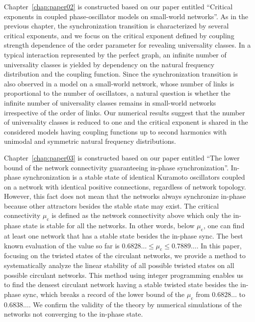 Chapter~\ref{chap:paper02} is constructed based on our paper \cite{yoneda2020} entitled ``Critical exponents in coupled phase-oscillator models on small-world networks''.
As in the previous chapter, the synchronization transition is characterized by several critical exponents, and we focus on the critical exponent defined by coupling strength dependence of the order parameter for revealing universality classes. In a typical interaction represented by the perfect graph, an infinite number of universality classes is yielded by dependency on the natural frequency distribution and the coupling function. Since the synchronization transition is also observed in a model on a small-world network, whose number of links is proportional to the number of oscillators, a natural question is whether the infinite number of universality classes remains in small-world networks irrespective of the order of links. Our numerical results suggest that the number of universality classes is reduced to one and the critical exponent is shared in the considered models having coupling functions up to second harmonics with unimodal and symmetric natural frequency distributions.

Chapter~\ref{chap:paper03} is constructed based on our paper \cite{yoneda2021} entitled ``The lower bound of the network connectivity guaranteeing in-phase synchronization''.
In-phase synchronization is a stable state of identical Kuramoto oscillators coupled on a network with identical positive connections, regardless of network topology. However, this fact does not mean that the networks always synchronize in-phase because other attractors besides the stable state may exist. The critical connectivity $\mu_{\mathrm{c}}$ is defined as the network connectivity above which only the in-phase state is stable for all the networks. In other words, below $\mu_{\mathrm{c}}$, one can find at least one network that has a stable state besides the in-phase sync. The best known evaluation of the value so far is $0.6828\dots\leq\mu_{\mathrm{c}}\leq0.7889\dots$. In this paper, focusing on the twisted states of the circulant networks, we provide a method to systematically analyze the linear stability of all possible twisted states on all possible circulant networks. This method using integer programming enables us to find the densest circulant network having a stable twisted state besides the in-phase sync, which breaks a record of the lower bound of the $\mu_{\mathrm{c}}$ from $0.6828\dots$ to $0.6838\dots$. We confirm the validity of the theory by numerical simulations of the networks not converging to the in-phase state.

